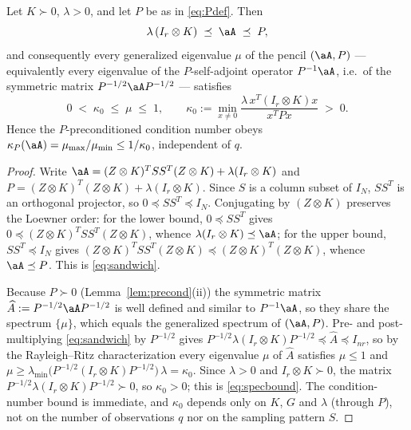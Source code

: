 \begin{lemma}\label{lem:specequiv}
Let $K\succ0$, $\lambda>0$, and let $P$ be as in \eqref{eq:Pdef}. Then
\begin{equation}\label{eq:sandwich}
  \lambda\,(I_r\otimes K)\;\preceq\;\aA\;\preceq\;P,
\end{equation}
and consequently every generalized eigenvalue $\mu$ of the pencil
$(\aA,P)$ --- equivalently every eigenvalue of the $P$-self-adjoint operator
$P^{-1}\aA$, i.e.\ of the symmetric matrix $P^{-1/2}\aA P^{-1/2}$ --- satisfies
\begin{equation}\label{eq:specbound}
  0\;<\;\kappa_0\;\le\;\mu\;\le\;1,
  \qquad
  \kappa_0:=\min_{x\neq0}\frac{\lambda\,x^{T}(I_r\otimes K)x}{x^{T}Px}\;>\;0 .
\end{equation}
Hence the $P$-preconditioned condition number obeys
$\kappa_P(\aA)=\mu_{\max}/\mu_{\min}\le 1/\kappa_0$, independent of $q$.
\end{lemma}

\begin{proof}
Write $\aA=(Z\otimes K)^{T}SS^{T}(Z\otimes K)+\lambda(I_r\otimes K)$ and
$P=(Z\otimes K)^{T}(Z\otimes K)+\lambda(I_r\otimes K)$. Since $S$ is a column
subset of $I_N$, $SS^{T}$ is an orthogonal projector, so
$0\preceq SS^{T}\preceq I_N$. Conjugating by $(Z\otimes K)$ preserves the
Loewner order: for the lower bound, $0\preceq SS^{T}$ gives
$0\preceq(Z\otimes K)^{T}SS^{T}(Z\otimes K)$, whence
$\lambda(I_r\otimes K)\preceq\aA$; for the upper bound, $SS^{T}\preceq I_N$
gives $(Z\otimes K)^{T}SS^{T}(Z\otimes K)\preceq(Z\otimes K)^{T}(Z\otimes K)$,
whence $\aA\preceq P$. This is \eqref{eq:sandwich}.

Because $P\succ0$ (Lemma~\ref{lem:precond}(ii)) the symmetric matrix
$\widehat A:=P^{-1/2}\aA P^{-1/2}$ is well defined and similar to $P^{-1}\aA$,
so they share the spectrum $\{\mu\}$, which equals the generalized spectrum of
$(\aA,P)$. Pre- and post-multiplying \eqref{eq:sandwich} by $P^{-1/2}$ gives
$P^{-1/2}\lambda(I_r\otimes K)P^{-1/2}\preceq\widehat A\preceq I_{nr}$, so by
the Rayleigh--Ritz characterization every eigenvalue $\mu$ of $\widehat A$
satisfies $\mu\le1$ and
$\mu\ge\lambda_{\min}\!\big(P^{-1/2}(I_r\otimes K)P^{-1/2}\big)\,\lambda=\kappa_0$.
Since $\lambda>0$ and $I_r\otimes K\succ0$, the matrix
$P^{-1/2}\lambda(I_r\otimes K)P^{-1/2}\succ0$, so $\kappa_0>0$; this is
\eqref{eq:specbound}. The condition-number bound is immediate, and $\kappa_0$
depends only on $K$, $G$ and $\lambda$ (through $P$), not on the number of
observations $q$ nor on the sampling pattern $S$.
\end{proof}

